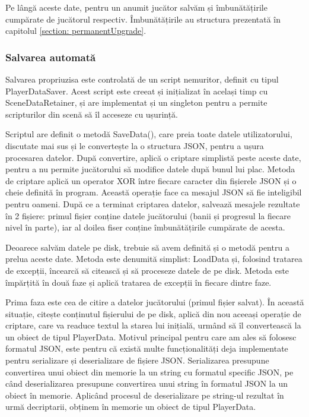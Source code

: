 \documentclass[12pt, a4paper]{article}
\begin{document}
	Pe lângă aceste date, pentru un anumit jucător salvăm și îmbunătățirile cumpărate de jucătorul respectiv. Îmbunătățirile au structura prezentată în capitolul \ref{section: permanentUpgrade}.
	
	
	
	
	
	\subsubsection{Salvarea automată}
	
	Salvarea propriuzisa este controlată de un script nemuritor, definit cu tipul PlayerDataSaver. Acest script este creeat și inițializat în același timp cu SceneDataRetainer, și are implementat și un singleton pentru a permite scripturilor din scenă să îl acceseze cu ușurință.
	\newline
	
	Scriptul are definit o metodă SaveData(), care preia toate datele utilizatorului, discutate mai sus și le convertește la o structura JSON, pentru a ușura procesarea datelor. După convertire, aplică o criptare simplistă peste aceste date, pentru a nu permite jucătorului să modifice datele după bunul lui plac. Metoda de criptare aplică un operator XOR între fiecare caracter din fișierele JSON și o cheie definită în program. Această operație face ca mesajul JSON să fie inteligibil pentru oameni. După ce a terminat criptarea datelor, salvează mesajele rezultate în 2 fișiere: primul fișier conține datele jucătorului (banii și progresul la fiecare nivel în parte), iar al doilea fiser conține îmbunătățirile cumpărate de acesta.
	\newline
	
	Deoarece salvăm datele pe disk, trebuie să avem definită și o metodă pentru a prelua aceste date. Metoda este denumită simplist: LoadData și, folosind tratarea de excepții, încearcă să citească și să proceseze datele de pe disk. Metoda este împărțită în două faze și aplică tratarea de excepții în fiecare dintre faze. 
	\newline
	
	Prima faza este cea de citire a datelor jucătorului (primul fișier salvat). În această situație, citește conținutul fișierului de pe disk, aplică din nou aceeași operație de criptare, care va readuce textul la starea lui inițială, urmând să îl convertească la un obiect de tipul PlayerData. Motivul principal pentru care am ales să folosesc formatul JSON, este pentru că există multe funcționalități deja implementate pentru serializare și deserializare de fișiere JSON. Serializarea presupune convertirea unui obiect din memorie la un string cu formatul specific JSON, pe când deserializarea presupune convertirea unui string în formatul JSON la un obiect în memorie. Aplicând procesul de deserializare pe string-ul rezultat în urmă decriptarii, obținem în memorie un obiect de tipul PlayerData.
	\newline
	
\end{document}
